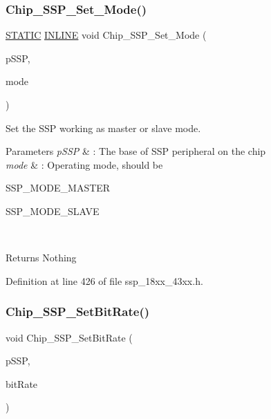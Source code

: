 \subsubsection{\texorpdfstring{Chip\+\_\+\+S\+S\+P\+\_\+\+Set\+\_\+\+Mode()}{Chip\_SSP\_Set\_Mode()}}
{\footnotesize\ttfamily \hyperlink{group___l_p_c___types___public___macros_ga10b2d890d871e1489bb02b7e70d9bdfb}{S\+T\+A\+T\+IC} \hyperlink{spifi__18xx__43xx_8h_a2eb6f9e0395b47b8d5e3eeae4fe0c116}{I\+N\+L\+I\+NE} void Chip\+\_\+\+S\+S\+P\+\_\+\+Set\+\_\+\+Mode (\begin{DoxyParamCaption}\item[{\hyperlink{struct_l_p_c___s_s_p___t}{L\+P\+C\+\_\+\+S\+S\+P\+\_\+T} $\ast$}]{p\+S\+SP,  }\item[{uint32\+\_\+t}]{mode }\end{DoxyParamCaption})}



Set the S\+SP working as master or slave mode. 


\begin{DoxyParams}{Parameters}
{\em p\+S\+SP} & \+: The base of S\+SP peripheral on the chip \\
\hline
{\em mode} & \+: Operating mode, should be
\begin{DoxyItemize}
\item S\+S\+P\+\_\+\+M\+O\+D\+E\+\_\+\+M\+A\+S\+T\+ER
\item S\+S\+P\+\_\+\+M\+O\+D\+E\+\_\+\+S\+L\+A\+VE 
\end{DoxyItemize}\\
\hline
\end{DoxyParams}
\begin{DoxyReturn}{Returns}
Nothing 
\end{DoxyReturn}


Definition at line 426 of file ssp\+\_\+18xx\+\_\+43xx.\+h.

\mbox{\label{group___s_s_p__18_x_x__43_x_x_ga373660d8ad7b28fb71209539b1e72717}} 
\subsubsection{\texorpdfstring{Chip\+\_\+\+S\+S\+P\+\_\+\+Set\+Bit\+Rate()}{Chip\_SSP\_SetBitRate()}}
{\footnotesize\ttfamily void Chip\+\_\+\+S\+S\+P\+\_\+\+Set\+Bit\+Rate (\begin{DoxyParamCaption}\item[{\hyperlink{struct_l_p_c___s_s_p___t}{L\+P\+C\+\_\+\+S\+S\+P\+\_\+T} $\ast$}]{p\+S\+SP,  }\item[{uint32\+\_\+t}]{bit\+Rate }\end{DoxyParamCaption})}



